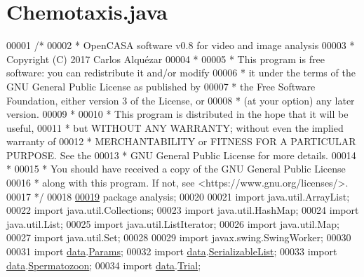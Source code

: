 \hypertarget{_chemotaxis_8java_source}{}\section{Chemotaxis.\+java}
\label{_chemotaxis_8java_source}

\begin{DoxyCode}
00001 \textcolor{comment}{/*}
00002 \textcolor{comment}{ *   OpenCASA software v0.8 for video and image analysis}
00003 \textcolor{comment}{ *   Copyright (C) 2017  Carlos Alquézar}
00004 \textcolor{comment}{ *}
00005 \textcolor{comment}{ *   This program is free software: you can redistribute it and/or modify}
00006 \textcolor{comment}{ *   it under the terms of the GNU General Public License as published by}
00007 \textcolor{comment}{ *   the Free Software Foundation, either version 3 of the License, or}
00008 \textcolor{comment}{ *   (at your option) any later version.}
00009 \textcolor{comment}{ *}
00010 \textcolor{comment}{ *   This program is distributed in the hope that it will be useful,}
00011 \textcolor{comment}{ *   but WITHOUT ANY WARRANTY; without even the implied warranty of}
00012 \textcolor{comment}{ *   MERCHANTABILITY or FITNESS FOR A PARTICULAR PURPOSE.  See the}
00013 \textcolor{comment}{ *   GNU General Public License for more details.}
00014 \textcolor{comment}{ *}
00015 \textcolor{comment}{ *   You should have received a copy of the GNU General Public License}
00016 \textcolor{comment}{ *   along with this program.  If not, see <https://www.gnu.org/licenses/>.}
00017 \textcolor{comment}{*/}         
00018 
\hypertarget{_chemotaxis_8java_source_l00019}{}\hyperlink{namespaceanalysis}{00019} \textcolor{keyword}{package }analysis;
00020 
00021 \textcolor{keyword}{import} java.util.ArrayList;
00022 \textcolor{keyword}{import} java.util.Collections;
00023 \textcolor{keyword}{import} java.util.HashMap;
00024 \textcolor{keyword}{import} java.util.List;
00025 \textcolor{keyword}{import} java.util.ListIterator;
00026 \textcolor{keyword}{import} java.util.Map;
00027 \textcolor{keyword}{import} java.util.Set;
00028 
00029 \textcolor{keyword}{import} javax.swing.SwingWorker;
00030 
00031 \textcolor{keyword}{import} \hyperlink{namespacedata}{data}.\hyperlink{classdata_1_1_params}{Params};
00032 \textcolor{keyword}{import} \hyperlink{namespacedata}{data}.\hyperlink{classdata_1_1_serializable_list}{SerializableList};
00033 \textcolor{keyword}{import} \hyperlink{namespacedata}{data}.\hyperlink{classdata_1_1_spermatozoon}{Spermatozoon};
00034 \textcolor{keyword}{import} \hyperlink{namespacedata}{data}.\hyperlink{classdata_1_1_trial}{Trial};

\end{DoxyCode}
